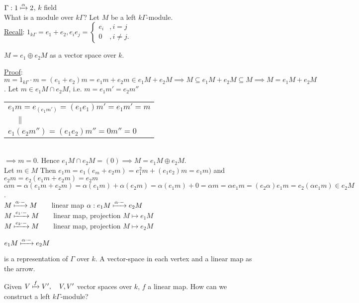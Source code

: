 \begin{exam}
\(\Gamma :1\xmapsto{\alpha} 2\), \(k\) field\\
What is a module over \(k\Gamma\)? Let \(M\) be a left \(k\Gamma\)-module.\\
\underline{Recall}: \(1_{k\Gamma} = e_1 + e_2, e_ie_j = \begin{cases}
    e_i &, i=j \\
    0\, & ,i\not=j.
\end{cases}\)\\
\begin{prop}
 \(M = e_1\oplus e_2M\) as a vector space over \(k\).
\end{prop}
\noindent\underline{Proof}: \(m = 1_{k\Gamma}\cdot m = (e_1 + e_2)m = e_1m + e_2m \in e_1M + e_2M \implies M\subseteq e_1M + e_2M \subseteq M \implies M = e_1M + e_2M\). Let \(m\in e_1M\cap e_2M\), i.e. \(m = e_1m' = e_2m''\)\\[0.5cm]
\begin{tabular}{l}
     \(e_1m = e_(e_1m') = (e_1e_1)m' = e_1m' = m\)  \\
     \(\quad\parallel\) \\
     \(e_1(e_2m'') = (e_1e_2)m'' = 0m'' = 0\)
\end{tabular}\\[0.5cm]
\(\implies m= 0.\) Hence \(e_1M\cap e_2M = (0) \implies M = e_1M \oplus e_2M\).\\
Let \(m\in M\) Then \(e_1m = e_1(e_m + e_2m) = e_1^2m + (e_1e_2)m = e_1m)\) and \(e_2m = e_2(e_1m + e_2m) = e_2m\)\\
\(\alpha m = \alpha(e_1m + e_2m) = \alpha(e_1m) + \alpha(e_2m) = \alpha(e_1m) + 0 = \alpha m = \alpha e_1 m = (e_2\alpha)e_1m = e_2(\alpha e_1 m)\in e_2M\).\\[1cm]
\(M \xmapsto{\alpha\cdot-} M \quad\quad\)linear map \(\alpha:e_1M\xmapsto{\alpha\cdot-}e_2M\)\\
\(M\xmapsto{e_1\cdot-}M\quad\quad\)linear map, projection \(M\mapsto e_1M\)\\
\(M\xmapsto{e_2\cdot-}M\quad\quad\)linear map, projection \(M\mapsto e_2M\)\\

\begin{center}
\(e_1M \xmapsto{\alpha\cdot -}e_2M\)
\end{center}
is a representation of \(\Gamma\) over \(k\). A vector-space in each vertex and a linear map as the arrow.
\end{exam}
\noindent Given \(V\xmapsto{f}V',\quad V,V'\) vector spaces over \(k\), \(f\) a linear map. How can we construct a left \(k\Gamma\)-module?\\
